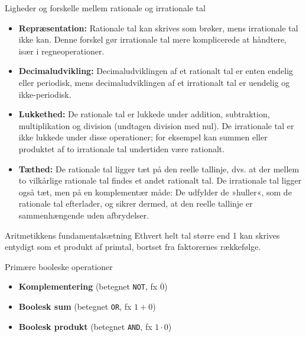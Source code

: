 \begin{custombox}{Ligheder og forskelle mellem rationale og irrationale tal}
    \begin{itemize}
    \item \textbf{Repræsentation:} Rationale tal kan skrives som brøker, mens irrationale tal ikke kan. Denne forskel gør irrationale tal mere komplicerede at håndtere, især i regneoperationer.

    \item \textbf{Decimaludvikling:} Decimaludviklingen af et rationalt tal er enten endelig eller periodisk, mens decimaludviklingen af et irrationalt tal er uendelig og ikke-periodisk.

    \item \textbf{Lukkethed:} De rationale tal er lukkede under addition, subtraktion, multiplikation og division (undtagen division med nul). De irrationale tal er ikke lukkede under disse operationer; for eksempel kan summen eller produktet af to irrationale tal undertiden være rationalt.

    \item \textbf{Tæthed:} De rationale tal ligger tæt på den reelle tallinje, dvs. at der mellem to vilkårlige rationale tal findes et andet rationalt tal. De irrationale tal ligger også tæt, men på en komplementær måde: De udfylder de »huller«, som de rationale tal efterlader, og sikrer dermed, at den reelle tallinje er sammenhængende uden afbrydelser.
\end{itemize}
\end{custombox}

\begin{theorem}{Aritmetikkens fundamentalsætning}
Ethvert helt tal større end 1 kan skrives entydigt som et produkt af primtal, bortset fra faktorernes rækkefølge.
\end{theorem}


\begin{custombox}{Primære booleske operationer}
    

\begin{itemize}
    \item \textbf{Komplementering} (betegnet \texttt{NOT}, fx $\overline{0}$)
    \item \textbf{Boolesk sum} (betegnet \texttt{OR}, fx $1 + 0$)
    \item \textbf{Boolesk produkt} (betegnet \texttt{AND}, fx $1 \cdot 0$)
\end{itemize}
\end{custombox}

